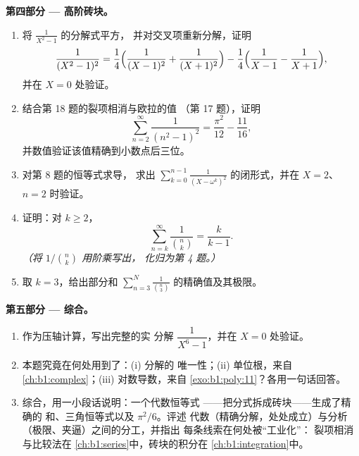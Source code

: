 \begin{problem}
\medskip
\noindent\textbf{第四部分 --- 高阶砖块。}
\begin{enumerate}[resume]
  \item 将 $\frac1{X^2-1}$ 的分解式平方，
        并对交叉项重新分解，证明
        \[
        \frac1{(X^2-1)^2}
        = \frac14\Bigl(\frac1{(X-1)^2} + \frac1{(X+1)^2}\Bigr)
        - \frac14\Bigl(\frac1{X-1} - \frac1{X+1}\Bigr),
        \]
        并在 $X = 0$ 处验证。
  \item 结合第 18 题的裂项相消与欧拉的值
        （第 17 题），证明
        \[
        \sum_{n=2}^{\infty}\frac1{(n^2-1)^2}
        = \frac{\pi^2}{12} - \frac{11}{16} ,
        \]
        并数值验证该值精确到小数点后三位。
  \item 对第 8 题的恒等式求导，
        求出 $\sum_{k=0}^{n-1}\frac1{(X -
        \omega^k)^2}$ 的闭形式，并在 $X = 2$、$n = 2$ 时验证。
  \item 证明：对 $k \geq 2$，
        \[
        \sum_{n=k}^{\infty}\frac{1}{\binom nk} = \frac{k}{k-1} .
        \]
        \emph{（将 $1/\binom nk$ 用阶乘写出，
        化归为第 4 题。）}
  \item 取 $k = 3$，给出部分和
        $\sum_{n=3}^{N}\frac1{\binom n3}$ 的精确值及其极限。
\end{enumerate}

\medskip
\noindent\textbf{第五部分 --- 综合。}
\begin{enumerate}[resume]
  \item 作为压轴计算，写出完整的实
        分解 $\dfrac1{X^6 - 1}$，并在 $X =
        0$ 处验证。
  \item 本题究竟在何处用到了：(i) 分解的
        唯一性；(ii) 单位根，来自
        \cref{ch:b1:complex}；(iii) 对数导数，来自
        \cref{exo:b1:poly:11}？各用一句话回答。
  \item 综合，用一小段话说明：一个代数恒等式
        ——把分式拆成砖块——生成了精确的
        和、三角恒等式以及 $\pi^2/6$。评述
        代数（精确分解，处处成立）与分析
        （极限、夹逼）之间的分工，并指出
        每条线索在何处被“工业化”：
        裂项相消与比较法在
        \cref{ch:b1:series}中，砖块的积分在
        \cref{ch:b1:integration}中。
\end{enumerate}
\end{problem}
